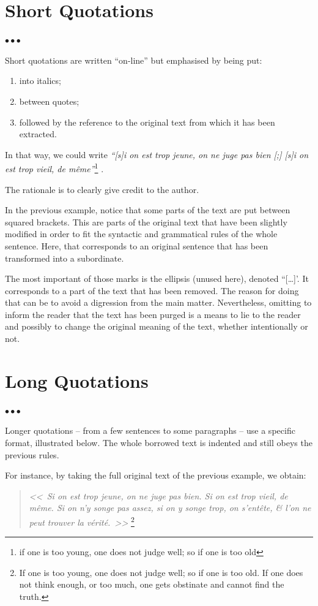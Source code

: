 \documentclass[11pt, english, screen, research-development]{report-rd-info}
\newenvironment{explanation}
{\color{blue}
 \begin{list}{}{\hspace{0.2\textwidth}\color{blue}}\item $\bullet\bullet\bullet$
}
{\end{list}}
\begin{document}
\section{Short Quotations}

\begin{explanation}
   Short quotations are written ``on-line'' but emphasised by being put:
   \begin{enumerate}
      \item into italics;
      \item between quotes;
      \item followed by the reference to the original text from which it has been extracted.
   \end{enumerate}

   In that way, we could write \emph{``[s]i on est trop jeune, on ne juge pas bien [;] [s]i on est trop vieil, de même''}\footnote{if one is too young, one does not judge well;  so if one is too old} \cite{Pascal-1671}.

   The rationale is to clearly give credit to the author.

   \bigskip

   In the previous example, notice that some parts of the text are put between squared brackets.
   This are parts of the original text that have been slightly modified in order to fit the syntactic and grammatical rules of the whole sentence.
   Here, that corresponds to an original sentence that has been transformed into a subordinate.

   The most important of those marks is the ellipsis (unused here), denoted ``[\ldots]'.
   It corresponds to a part of the text that has been removed.
   The reason for doing that can be to avoid a digression from the main matter.
   Nevertheless, omitting to inform the reader that the text has been purged is a means to lie to the reader and possibly to change the original meaning of the text, whether intentionally or not.
\end{explanation}

\section{Long Quotations}

\begin{explanation}
   Longer quotations -- from a few sentences to some paragraphs -- use a specific format, illustrated below.
   The whole borrowed text is indented and still obeys the previous rules.

   For instance, by taking the full original text of the previous example, we obtain:
   \begin{quote}
      \emph{<<~Si on est trop jeune, on ne juge pas bien.
      Si on est trop vieil, de même.
      Si on n'y songe pas assez, si on y songe trop, on s'entête, \& l'on ne peut trouver la vérité.~>>}%
      \footnote{If one is too young, one does not judge well;  so if one is too old.
         If one does not think enough, or too much, one gets obstinate and cannot find the truth.} \cite{Pascal-1671}
   \end{quote}
\end{explanation}
\end{document}
